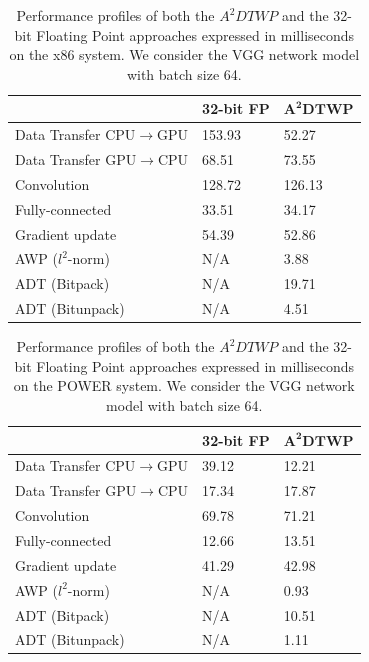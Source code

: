 \begin{table}
    \caption{Performance profiles of both the $A^2DTWP$ and the 32-bit Floating 
    Point approaches expressed in milliseconds on the x86 system.  We consider 
    the VGG network model with batch size 64.} 
    \centering
    \begin{tabular}{|P{4.5cm}|P{2.5cm}|P{2.5cm}|}
    \hline
    & \textbf{32-bit FP} & $\mathbf{A^2DTWP}$\\
    \hline
    Data Transfer CPU$\rightarrow$GPU& 153.93 & 52.27 \\
    \hline
    Data Transfer GPU$\rightarrow$CPU& 68.51 & 73.55 \\
    \hline
    Convolution & 128.72 & 126.13\\
    \hline
    Fully-connected & 33.51 & 34.17 \\
    \hline
    Gradient update & 54.39 & 52.86\\
    \hline
    AWP ($l^2$-norm) & N/A & 3.88 \\
    \hline
    ADT (Bitpack) & N/A & 19.71 \\
    \hline
    ADT (Bitunpack) & N/A & 4.51 \\
    \hline
    \end{tabular}
    \label{table:performance}
\end{table}

\begin{table}
    \caption{Performance profiles of both the $A^2DTWP$ and the 32-bit Floating 
    Point approaches expressed in milliseconds on the POWER system.  We consider 
    the VGG network model with batch size 64.} 
    \centering
    \begin{tabular}{|P{4.5cm}|P{2.5cm}|P{2.5cm}|}
    \hline
    & \textbf{32-bit FP} & $\mathbf{A^2DTWP}$ \\
    \hline
    Data Transfer CPU$\rightarrow$GPU& 39.12 & 12.21 \\
    \hline
    Data Transfer GPU$\rightarrow$CPU& 17.34 & 17.87 \\
    \hline
    Convolution & 69.78 & 71.21\\
    \hline
    Fully-connected & 12.66 & 13.51 \\
    \hline
    Gradient update & 41.29 & 42.98\\
    \hline
    AWP ($l^2$-norm) & N/A & 0.93 \\
    \hline
    ADT (Bitpack) & N/A & 10.51 \\
    \hline
    ADT (Bitunpack) & N/A & 1.11 \\
    \hline
    \end{tabular}
    \label{table:performance_p9}
\end{table}

